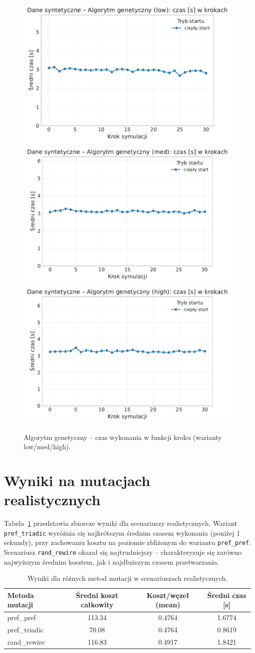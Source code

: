 \begin{figure}[H]
  \centering
  \includegraphics[width=0.32\linewidth]{assets/figures/dynamic/synthetic/synthetic_algorytm_genetyczny_time_over_steps_low.pdf}
  \includegraphics[width=0.32\linewidth]{assets/figures/dynamic/synthetic/synthetic_algorytm_genetyczny_time_over_steps_med.pdf}
  \includegraphics[width=0.32\linewidth]{assets/figures/dynamic/synthetic/synthetic_algorytm_genetyczny_time_over_steps_high.pdf}
  \caption{Algorytm genetyczny -- czas wykonania w funkcji kroku (warianty low/med/high).}
  \label{fig:dyn-synth-genetic-time}
\end{figure}

\section{Wyniki na mutacjach realistycznych}
Tabela~\ref{tab:dyn-real-warm} przedstawia zbiorcze wyniki dla scenariuszy realistycznych. Wariant \texttt{pref\_triadic} wyróżnia się najkrótszym średnim czasem wykonania (poniżej 1 sekundy), przy zachowaniu kosztu na poziomie zbliżonym do wariantu \texttt{pref\_pref}. Scenariusz \texttt{rand\_rewire} okazał się najtrudniejszy -- charakteryzuje się zarówno najwyższym średnim kosztem, jak i najdłuższym czasem przetwarzania.

\begin{table}[H]
  \centering
  \caption{Wyniki dla różnych metod mutacji w scenariuszach realistycznych.}
  \label{tab:dyn-real-warm}
  \begin{tabular}{lccc}
    \toprule
    \textbf{Metoda mutacji} & \textbf{Średni koszt całkowity} & \textbf{Koszt/węzeł (mean)} & \textbf{Średni czas [s]} \\
    \midrule
    pref\_pref              & 113.34                          & 0.4764                      & 1.6774                   \\
    pref\_triadic           & 70.08                           & 0.4764                      & 0.8619                   \\
    rand\_rewire            & 116.83                          & 0.4917                      & 1.8421                   \\
    \bottomrule
  \end{tabular}
\end{table}

